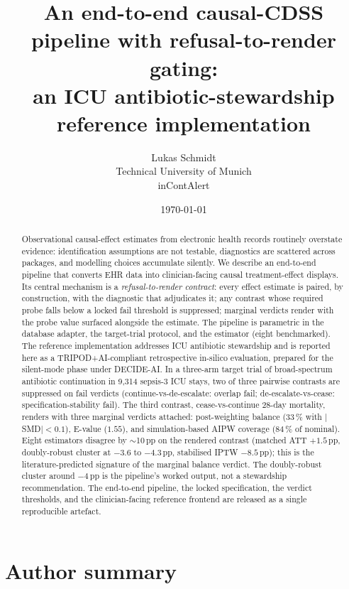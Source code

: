 \documentclass[11pt,a4paper]{article}
\title{\bfseries An end-to-end causal-CDSS pipeline with refusal-to-render gating:\\
\large an ICU antibiotic-stewardship reference implementation}
\author{Lukas Schmidt\\
\small Technical University of Munich\\
\small inContAlert}
\date{\today}
\begin{document}
\maketitle
\vspace{-1.5em}

\begin{abstract}
\small
Observational causal-effect estimates from electronic health records routinely overstate evidence: identification assumptions are not testable, diagnostics are scattered across packages, and modelling choices accumulate silently. We describe an end-to-end pipeline that converts EHR data into clinician-facing causal treatment-effect displays. Its central mechanism is a \emph{refusal-to-render contract}: every effect estimate is paired, by construction, with the diagnostic that adjudicates it; any contrast whose required probe falls below a locked fail threshold is suppressed; marginal verdicts render with the probe value surfaced alongside the estimate. The pipeline is parametric in the database adapter, the target-trial protocol, and the estimator (eight benchmarked). The reference implementation addresses ICU antibiotic stewardship and is reported here as a TRIPOD+AI-compliant retrospective in-silico evaluation, prepared for the silent-mode phase under DECIDE-AI. In a three-arm target trial of broad-spectrum antibiotic continuation in 9{,}314 sepsis-3 ICU stays, two of three pairwise contrasts are suppressed on fail verdicts (continue-vs-de-escalate: overlap fail; de-escalate-vs-cease: specification-stability fail). The third contrast, cease-vs-continue 28-day mortality, renders with three marginal verdicts attached: post-weighting balance ($33\,\%$ with $|$SMD$|<0.1$), E-value ($1.55$), and simulation-based AIPW coverage ($84\,\%$ of nominal). Eight estimators disagree by $\sim$10\,pp on the rendered contrast (matched ATT $+1.5$\,pp, doubly-robust cluster at $-3.6$ to $-4.3$\,pp, stabilised IPTW $-8.5$\,pp); this is the literature-predicted signature of the marginal balance verdict. The doubly-robust cluster around $-4$\,pp is the pipeline's worked output, not a stewardship recommendation. The end-to-end pipeline, the locked specification, the verdict thresholds, and the clinician-facing reference frontend are released as a single reproducible artefact.
\end{abstract}

\section*{Author summary}
\end{document}
